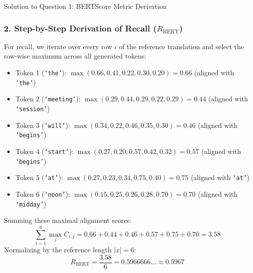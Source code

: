 \documentclass[11pt,a4paper]{article}
\begin{document}
\begin{solutionbox}{Solution to Question 1: BERTScore Metric Derivation}
\subsubsection*{2. Step-by-Step Derivation of Recall ($R_{\text{BERT}}$)}
For recall, we iterate over every row $i$ of the reference translation and select the row-wise maximum across all generated tokens:
\begin{itemize}[leftmargin=1.5cm,itemsep=1pt]
    \item Token 1 (\texttt{`the'}): $\max(0.66, 0.41, 0.22, 0.30, 0.20) = \mathbf{0.66}$ \quad (aligned with \texttt{`the'})
    \item Token 2 (\texttt{`meeting'}): $\max(0.29, 0.44, 0.29, 0.22, 0.29) = \mathbf{0.44}$ \quad (aligned with \texttt{`session'})
    \item Token 3 (\texttt{`will'}): $\max(0.34, 0.22, 0.46, 0.35, 0.30) = \mathbf{0.46}$ \quad (aligned with \texttt{`begins'})
    \item Token 4 (\texttt{`start'}): $\max(0.27, 0.20, 0.57, 0.42, 0.32) = \mathbf{0.57}$ \quad (aligned with \texttt{`begins'})
    \item Token 5 (\texttt{`at'}): $\max(0.27, 0.23, 0.34, 0.75, 0.40) = \mathbf{0.75}$ \quad (aligned with \texttt{`at'})
    \item Token 6 (\texttt{`noon'}): $\max(0.15, 0.25, 0.26, 0.28, 0.70) = \mathbf{0.70}$ \quad (aligned with \texttt{`midday'})
\end{itemize}
Summing these maximal alignment scores:
\begin{equation*}
    \sum_{i=1}^{6} \max_{j} C_{i,j} = 0.66 + 0.44 + 0.46 + 0.57 + 0.75 + 0.70 = 3.58
\end{equation*}
Normalizing by the reference length $|x| = 6$:
\begin{equation}
    R_{\text{BERT}} = \frac{3.58}{6} = 0.5966666\dots \approx \mathbf{0.5967}
\end{equation}


\end{solutionbox}
\end{document}
